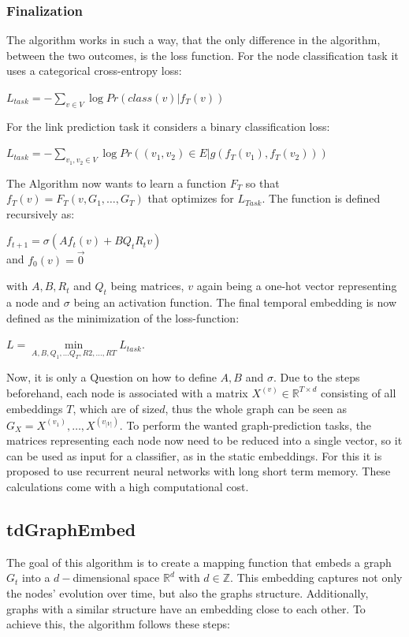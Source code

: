 \documentclass[sigconf]{acmart}
\begin{document}
\subsubsection{Finalization}
The algorithm works in such a way, that the only difference in the algorithm, between the two outcomes, is the loss function. 
For the node classification task it uses a categorical cross-entropy loss:
\begin{center}
 \(L_{task} = -\sum\limits_{v\in V} \log {Pr(class(v)|f_T(v))}\)
\end{center}
For the link prediction task it considers a binary classification loss: 
\begin{center}
  \(L_{task} = -\sum\limits_{v_1, v_2 \in V} \log{Pr((v_1,v_2)\in E | g(f_T(v_1), f_T(v_2)))}\)
\end{center}
The Algorithm now wants to learn a function \(F_T\) so that \(f_T(v) = F_T(v,G_1, \ldots, G_T)\) that optimizes for \(L_{Task}\).
The function is defined recursively as: 
\begin{center}
  \(f_{t+1} = \sigma(Af_t(v) + BQ_tR_tv)\) \\
  and \(f_0(v) = \vec{0}\)
\end{center}
with \(A,B,R_t\) and \(Q_t\) being matrices, \(v\) again being a one-hot vector representing a node and \(\sigma\) being an activation function.
The final temporal embedding is now defined as the minimization of the loss-function:
\begin{center}
  \( L = \min\limits_{A,B,Q_1, \ldots Q_T,R2, \ldots, RT} L_{task}\).
\end{center}
Now, it is only a Question on how to define \(A,B\) and \(\sigma\).
Due to the steps beforehand, each node is associated with a matrix \(X^{(v)} \in \mathbb{R}^{T \times d}\) consisting of 
all embeddings \(T\), which are of size\(d\), thus the whole graph can be seen as \(G_X = X^{(v_1)},\ldots, X^{(v_{|V|})}\).
To perform the wanted graph-prediction tasks, the matrices representing each node now need to be reduced into a single vector, so it can be used as input for a classifier, as in the static embeddings.
For this it is proposed to use recurrent neural networks with long short term memory. These calculations come with a high computational cost.
\cite{Singer.2019}

\subsection{tdGraphEmbed}
The goal of this algorithm is to create a mapping function that embeds a graph \(G_t\) into a \(d-\)dimensional space \(\mathbb{R}^d\) with \(d \in \mathbb{Z}\).
This embedding captures not only the nodes' evolution over time, but also the graphs structure. Additionally, graphs with a similar structure have an embedding close to each other.
To achieve this, the algorithm follows these steps:
\end{document}
